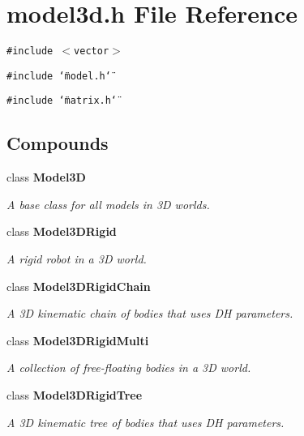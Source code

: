 \section{model3d.h File Reference}
\label{model3d_8h}
{\tt \#include $<$vector$>$}\par
{\tt \#include \char`\"{}model.h\char`\"{}}\par
{\tt \#include \char`\"{}matrix.h\char`\"{}}\par
\subsection*{Compounds}
\begin{CompactItemize}
\item 
class {\bf Model3D}
\begin{CompactList}\small\item\em A base class for all models in 3D worlds.\item\end{CompactList}\item 
class {\bf Model3DRigid}
\begin{CompactList}\small\item\em A rigid robot in a 3D world.\item\end{CompactList}\item 
class {\bf Model3DRigid\-Chain}
\begin{CompactList}\small\item\em A 3D kinematic chain of bodies that uses DH parameters.\item\end{CompactList}\item 
class {\bf Model3DRigid\-Multi}
\begin{CompactList}\small\item\em A collection of free-floating bodies in a 3D world.\item\end{CompactList}\item 
class {\bf Model3DRigid\-Tree}
\begin{CompactList}\small\item\em A 3D kinematic tree of bodies that uses DH parameters.\item\end{CompactList}\end{CompactItemize}
